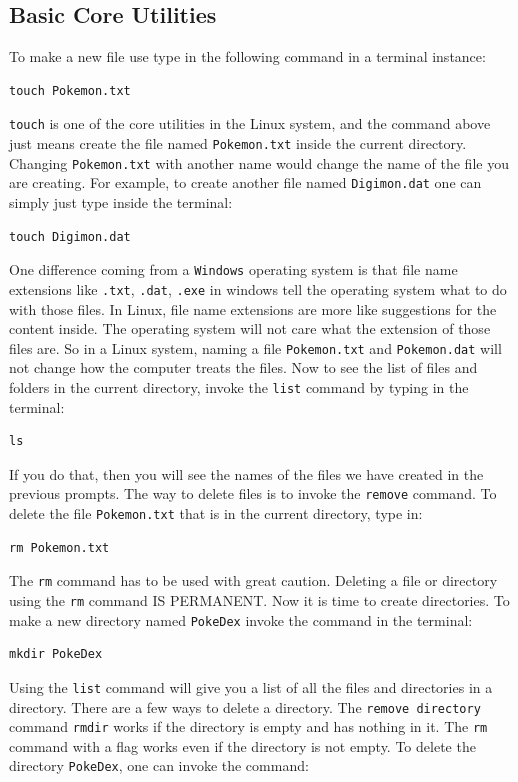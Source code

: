 \documentclass[a4paper, 12pt]{report}
\begin{document}
\begin{center}
\subsection{Basic Core Utilities}

To make a new file use type in the following command in a terminal instance:
\begin{lstlisting}
touch Pokemon.txt
\end{lstlisting}
\texttt{touch} is one of the core utilities in the Linux system, and the command above just means create the file named \texttt{Pokemon.txt} inside the current directory. Changing \texttt{Pokemon.txt} with another name would change the name of the file you are creating. For example, to create another file named \texttt{Digimon.dat} one can simply just type inside the terminal:
\begin{lstlisting}
touch Digimon.dat
\end{lstlisting}
One difference coming from a \texttt{Windows} operating system is that file name extensions like \texttt{.txt}, \texttt{.dat}, \texttt{.exe} in windows tell the operating system what to do with those files. In Linux, file name extensions are more like suggestions for the content inside. The operating system will not care what the extension of those files are. So in a Linux system, naming a file \texttt{Pokemon.txt} and \texttt{Pokemon.dat} will not change how the computer treats the files. Now to see the list of files and folders in the current directory, invoke the \texttt{list} command by typing in the terminal:
\begin{lstlisting}
ls
\end{lstlisting}
If you do that, then you will see the names of the files we have created in the previous prompts. The way to delete files is to invoke the \texttt{remove} command. To delete the file \texttt{Pokemon.txt} that is in the current directory, type in:
\begin{lstlisting}
rm Pokemon.txt
\end{lstlisting}
The \texttt{rm} command has to be used with great caution. Deleting a file or directory using the \texttt{rm} command IS PERMANENT. Now it is time to create directories. To make a new directory named \texttt{PokeDex} invoke the command in the terminal:
\begin{lstlisting}
mkdir PokeDex
\end{lstlisting}
Using the \texttt{list} command will give you a list of all the files and directories in a directory. There are a few ways to delete a directory. The \texttt{remove directory} command \texttt{rmdir} works if the directory is empty and has nothing in it. The \texttt{rm} command with a flag works even if the directory is not empty. To delete the directory \texttt{PokeDex}, one can invoke the command:

\end{center}
\end{document}
